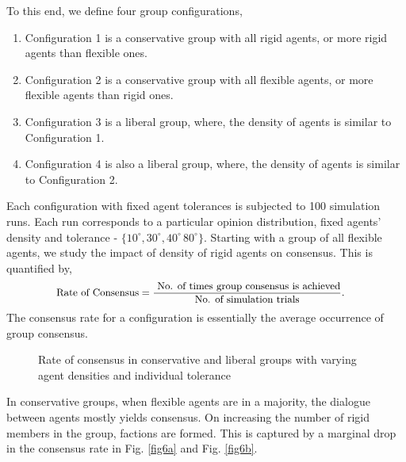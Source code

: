\documentclass[letterpaper,english,11pt]{article}
\begin{document}
To this end, we define four group configurations,

\begin{enumerate}
	\item Configuration 1 is a conservative group with all rigid agents, or more rigid agents than flexible ones.
	\item Configuration 2 is a conservative group with all flexible agents, or more flexible agents than rigid ones.
	\item Configuration 3 is a liberal group, where, the density of agents is similar to Configuration 1.
	\item Configuration 4 is also a liberal group, where, the density of agents is similar to Configuration 2.
	
\end{enumerate}
 Each configuration with fixed agent tolerances is subjected to 100 simulation runs. Each run corresponds to a particular opinion distribution, fixed agents' density and tolerance -            $\{10^\circ,30^\circ,40^\circ\,80^\circ\}$. Starting with a group of all flexible agents, we study the impact of density of rigid agents on consensus. This is quantified by, 
\begin{align}
\small
\begin{split}
&\text{Rate of Consensus} = \frac{\text{ No. of times group consensus is achieved}}{\text{No. of simulation trials}}.
\end{split}
\end{align}
 The consensus rate for a configuration is essentially the average occurrence of group consensus.
 \begin{figure*}
 	\centering
 	\hfil
 	\hfil
 	\hfil
 	\caption{Rate of consensus in conservative and liberal groups with varying agent densities and individual tolerance}
 	\label{fig6}
 \end{figure*}

In conservative groups, when flexible agents are in a majority, the dialogue between agents mostly yields consensus. On increasing the number of rigid members in the group, factions are formed. This is captured by a marginal drop in the consensus rate in Fig. \ref{fig6a} and Fig. \ref{fig6b}. 
 
\end{document}
